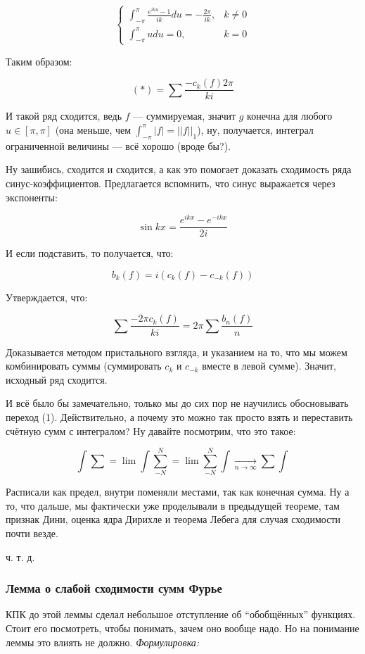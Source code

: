 \documentclass{article}
\def\goesto#1{\underset{#1}{\longrightarrow}}
\begin{document}
\[\begin{cases}
    \int_{-\pi}^{\pi} \frac{e^{iku} - 1}{ik} du = -\frac{2 \pi}{ik}, &k \neq 0\\
    \int_{-\pi}^{\pi} u du = 0, &k = 0
\end{cases}\]

Таким образом:

\[(*) = \sum \frac{-c_k(f)2\pi}{ki}\]

И такой ряд сходится, ведь $f$ --- суммируемая, значит $g$ конечна для любого $u \in [\pi, \pi]$ (она меньше, чем $\int_{-\pi}^{\pi} |f| = ||f||_1$), ну, получается, интеграл ограниченной величины --- всё хорошо (вроде бы?).

Ну зашибись, сходится и сходится, а как это помогает доказать сходимость ряда синус-коэффициентов. Предлагается вспомнить, что синус выражается через экспоненты:

\[\sin kx = \frac{e^{ikx} - e^{-ikx}}{2i}\]

И если подставить, то получается, что:

\[b_k(f) = i(c_k(f) - c_{-k}(f))\]

Утверждается, что:

\[\sum \frac{-2 \pi c_k(f)}{ki} = 2\pi \sum \frac{b_n(f)}{n}\]

Доказывается методом пристального взгляда, и указанием на то, что мы можем комбинировать суммы (суммировать $c_k$ и $c_{-k}$ вместе в левой сумме). Значит, исходный ряд сходится.

И всё было бы замечательно, только мы до сих пор не научились обосновывать переход (1). Действительно, а почему это можно так просто взять и переставить счётную сумм с интегралом? Ну давайте посмотрим, что это такое:

\[\int \sum = \lim \int \sum_{-N}^{N} = \lim \sum_{-N}^{N} \int \goesto{n \rightarrow \infty} \sum \int\]

Расписали как предел, внутри поменяли местами, так как конечная сумма. Ну а то, что дальше, мы фактически уже проделывали в предыдущей теореме, там признак Дини, оценка ядра Дирихле и теорема Лебега для случая сходимости почти везде.

ч. т. д. 

\subsubsection{Лемма о слабой сходимости сумм Фурье}

КПК до этой леммы сделал небольшое отступление об ``обобщённых'' функциях. Стоит его посмотреть, чтобы понимать, зачем оно вообще надо. Но на понимание леммы это влиять не должно.
\textit{Формулировка:}
\end{document}

